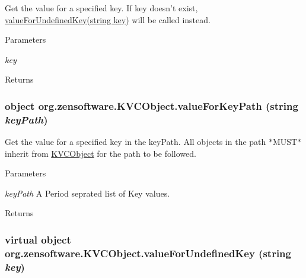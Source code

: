 Get the value for a specified key. If key doesn't exist, \hyperlink{classorg_1_1zensoftware_1_1_k_v_c_object_ad2e88f59c077b45c6778710a1e086163}{valueForUndefinedKey(string key)} will be called instead. 
\begin{DoxyParams}{Parameters}
\item[{\em key}]\end{DoxyParams}
\begin{DoxyReturn}{Returns}

\end{DoxyReturn}
\hypertarget{classorg_1_1zensoftware_1_1_k_v_c_object_a218765ff16ab97310232637f2068909c}{
\subsubsection[{valueForKeyPath}]{\setlength{\rightskip}{0pt plus 5cm}object org.zensoftware.KVCObject.valueForKeyPath (string {\em keyPath})}}
\label{classorg_1_1zensoftware_1_1_k_v_c_object_a218765ff16ab97310232637f2068909c}


Get the value for a specified key in the keyPath. All objects in the path $\ast$MUST$\ast$ inherit from \hyperlink{classorg_1_1zensoftware_1_1_k_v_c_object}{KVCObject} for the path to be followed. 
\begin{DoxyParams}{Parameters}
\item[{\em keyPath}]A Period seprated list of Key values.\end{DoxyParams}
\begin{DoxyReturn}{Returns}

\end{DoxyReturn}
\hypertarget{classorg_1_1zensoftware_1_1_k_v_c_object_ad2e88f59c077b45c6778710a1e086163}{
\subsubsection[{valueForUndefinedKey}]{\setlength{\rightskip}{0pt plus 5cm}virtual object org.zensoftware.KVCObject.valueForUndefinedKey (string {\em key})}}
\label{classorg_1_1zensoftware_1_1_k_v_c_object_ad2e88f59c077b45c6778710a1e086163}


